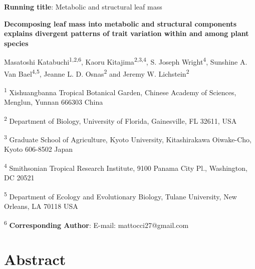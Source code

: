 \documentclass[
  12pt,
  a4paper,
,tablecaptionabove
]{scrartcl}
\date{}
\title{}
\author{}
\begin{document}




\ifdefined\Shaded\renewenvironment{Shaded}{\begin{tcolorbox}[interior hidden, borderline west={3pt}{0pt}{shadecolor}, frame hidden, boxrule=0pt, enhanced, breakable, sharp corners]}{\end{tcolorbox}}\fi

\textbf{Running title}: Metabolic and structural leaf mass

\textbf{Decomposing leaf mass into metabolic and structural components
explains divergent patterns of trait variation within and among plant
species}

Masatoshi Katabuchi\textsuperscript{1,2,6}, Kaoru
Kitajima\textsuperscript{2,3,4}, S. Joseph Wright\textsuperscript{4},
Sunshine A. Van Bael\textsuperscript{4,5}, Jeanne L. D.
Osnas\textsuperscript{2} and Jeremy W. Lichstein\textsuperscript{2}

\textsuperscript{1} Xishuangbanna Tropical Botanical Garden, Chinese
Academy of Sciences, Menglun, Yunnan 666303 China

\textsuperscript{2} Department of Biology, University of Florida,
Gainesville, FL 32611, USA

\textsuperscript{3} Graduate School of Agriculture, Kyoto University,
Kitashirakawa Oiwake-Cho, Kyoto 606-8502 Japan

\textsuperscript{4} Smithsonian Tropical Research Institute, 9100 Panama
City Pl., Washington, DC 20521

\textsuperscript{5} Department of Ecology and Evolutionary Biology,
Tulane University, New Orleans, LA 70118 USA

\textsuperscript{6} \textbf{Corresponding Author}: E-mail:
mattocci27@gmail.com

\newpage

\hypertarget{abstract}{%
\section{Abstract}\label{abstract}}
\end{document}
